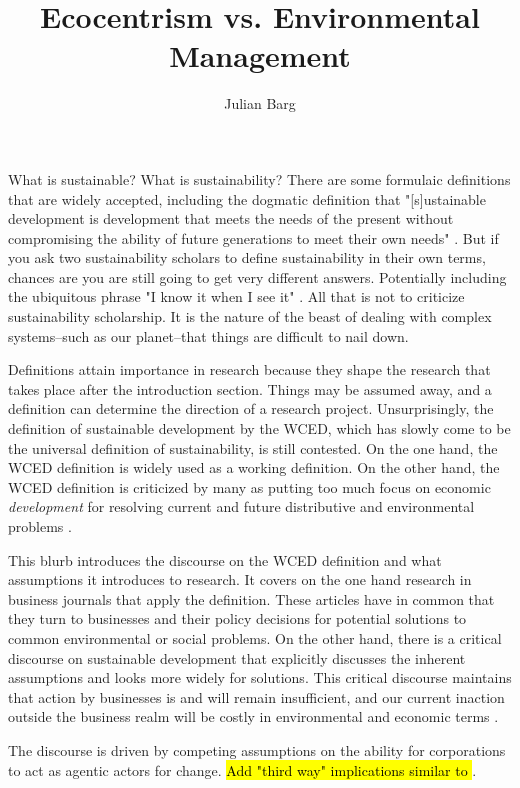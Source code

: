 \documentclass{article}
\title{Ecocentrism vs. Environmental Management}
\author{Julian Barg}
\begin{document}
	\maketitle

	What is sustainable? What is sustainability? There are some formulaic definitions that are widely accepted, including the dogmatic definition that "[s]ustainable development is development that meets the needs of the present without compromising the ability of future generations to meet their own needs" \citep[IV]{WCED1987}. But if you ask two sustainability scholars to define sustainability in their own terms, chances are you are still going to get very different answers. Potentially including the ubiquitous phrase "I know it when I see it" \citep{White2013}. All that is not to criticize sustainability scholarship. It is the nature of the beast of dealing with complex systems--such as our planet--that things are difficult to nail down.

	Definitions attain importance in research because they shape the research that takes place after the introduction section. Things may be assumed away, and a definition can determine the direction of a research project. Unsurprisingly, the definition of sustainable development by the WCED, which has slowly come to be the universal definition of sustainability, is still contested. On the one hand, the WCED definition is widely used as a working definition. On the other hand, the WCED definition is criticized by many as putting too much focus on economic \textit{development} for resolving current and future distributive and environmental problems \citep[e.g.,][6f.]{Constanza2014a}.

	This blurb introduces the discourse on the WCED definition and what assumptions it introduces to research. It covers on the one hand research in business journals that apply the definition. These articles have in common that they turn to businesses and their policy decisions for potential solutions to common environmental or social problems. On the other hand, there is a critical discourse on sustainable development that explicitly discusses the inherent assumptions and looks more widely for solutions. This critical  discourse maintains that action by businesses is and will remain insufficient, and our current inaction outside the business realm will be costly in environmental and economic terms \citep[e.g.,][]{Banerjee2003}.

	The discourse is driven by competing assumptions on the ability for corporations to act as agentic actors for change. \hl{Add "third way" implications similar to \citet{Giddens1979}}.	
\end{document}
